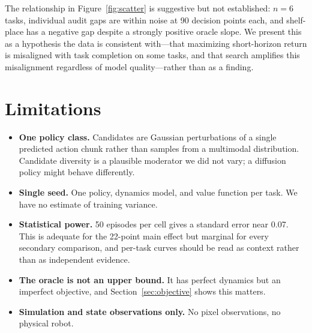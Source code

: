 \documentclass[11pt]{article}
\begin{document}
The relationship in Figure~\ref{fig:scatter} is suggestive but not established:
$n=6$ tasks, individual audit gaps are within noise at 90 decision points each,
and shelf-place has a negative gap despite a strongly positive oracle slope. We
present this as a hypothesis the data is consistent with---that maximizing
short-horizon return is misaligned with task completion on some tasks, and that
search amplifies this misalignment regardless of model quality---rather than as
a finding.

\section{Limitations}

\begin{itemize}
\item \textbf{One policy class.} Candidates are Gaussian perturbations of a
single predicted action chunk rather than samples from a multimodal
distribution. Candidate diversity is a plausible moderator we did not vary; a
diffusion policy might behave differently.
\item \textbf{Single seed.} One policy, dynamics model, and value function per
task. We have no estimate of training variance.
\item \textbf{Statistical power.} 50 episodes per cell gives a standard error
near 0.07. This is adequate for the 22-point main effect but marginal for every
secondary comparison, and per-task curves should be read as context rather than
as independent evidence.
\item \textbf{The oracle is not an upper bound.} It has perfect dynamics but an
imperfect objective, and Section~\ref{sec:objective} shows this matters.
\item \textbf{Simulation and state observations only.} No pixel observations, no
physical robot.
\end{itemize}
\end{document}

